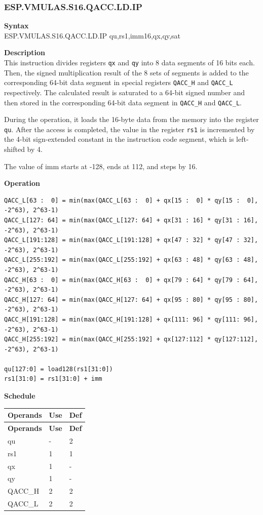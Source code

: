 \newpage
\subsubsection{ESP.VMULAS.S16.QACC.LD.IP}\label{instruction:ESPVMULASS16QACCLDIP}
\textbf{Syntax}\\
ESP.VMULAS.S16.QACC.LD.IP qu,rs1,imm16,qx,qy,sat

\textbf{Description}\\
This instruction divides registers \lstinline{qx} and \lstinline{qy} into 8 data segments of 16 bits each. Then, the signed multiplication result of the 8 sets of segments is added to the corresponding 64-bit data segment in special registers \lstinline{QACC_H} and \lstinline{QACC_L} respectively. The calculated result is saturated to a 64-bit signed number and then stored in the corresponding 64-bit data segment in \lstinline{QACC_H} and \lstinline{QACC_L}.

During the operation, it loads the 16-byte data from the memory into the register \lstinline{qu}. After the access is completed, the value in the register \lstinline{rs1} is incremented by the 4-bit sign-extended constant in the instruction code segment, which is left-shifted by 4.

The value of imm starts at -128, ends at 112, and steps by 16.

\textbf{Operation}\\
\begin{lstlisting}
QACC_L[63 :  0] = min(max(QACC_L[63 :  0] + qx[15 :  0] * qy[15 :  0], -2^63), 2^63-1)
QACC_L[127: 64] = min(max(QACC_L[127: 64] + qx[31 : 16] * qy[31 : 16], -2^63), 2^63-1)
QACC_L[191:128] = min(max(QACC_L[191:128] + qx[47 : 32] * qy[47 : 32], -2^63), 2^63-1)
QACC_L[255:192] = min(max(QACC_L[255:192] + qx[63 : 48] * qy[63 : 48], -2^63), 2^63-1)
QACC_H[63 :  0] = min(max(QACC_H[63 :  0] + qx[79 : 64] * qy[79 : 64], -2^63), 2^63-1)
QACC_H[127: 64] = min(max(QACC_H[127: 64] + qx[95 : 80] * qy[95 : 80], -2^63), 2^63-1)
QACC_H[191:128] = min(max(QACC_H[191:128] + qx[111: 96] * qy[111: 96], -2^63), 2^63-1)
QACC_H[255:192] = min(max(QACC_H[255:192] + qx[127:112] * qy[127:112], -2^63), 2^63-1)

qu[127:0] = load128(rs1[31:0])
rs1[31:0] = rs1[31:0] + imm
\end{lstlisting}

\textbf{Schedule}\\
\begin{longtable}[c]{|l|l|l|}
    \hline
    \rowcolor{lightgray}
    \textbf{Operands} & \textbf{Use} & \textbf{Def} \\\hline
    \endfirsthead
    \hline
    \rowcolor{lightgray}
     \textbf{Operands} & \textbf{Use} & \textbf{Def} \\\hline
    \endhead
    \hline
    \endfoot

    qu & - & 2 \\\hline
    rs1 & 1 & 1 \\\hline
     qx & 1 & - \\\hline
     qy & 1 & - \\\hline
     QACC\_H & 2 & 2 \\\hline
     QACC\_L & 2 & 2

\end{longtable}

